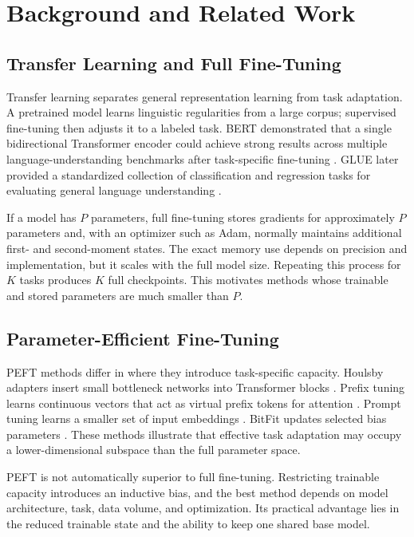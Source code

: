 \chapter{Background and Related Work}
\label{chap:background}

\section{Transfer Learning and Full Fine-Tuning}

Transfer learning separates general representation learning from task adaptation. A pretrained
model learns linguistic regularities from a large corpus; supervised fine-tuning then adjusts it
to a labeled task. BERT demonstrated that a single bidirectional Transformer encoder could achieve
strong results across multiple language-understanding benchmarks after task-specific fine-tuning
\citep{devlin2019bert}. GLUE later provided a standardized collection of classification and
regression tasks for evaluating general language understanding \citep{wang2018glue}.

If a model has $P$ parameters, full fine-tuning stores gradients for approximately $P$ parameters
and, with an optimizer such as Adam, normally maintains additional first- and second-moment states.
The exact memory use depends on precision and implementation, but it scales with the full model
size. Repeating this process for $K$ tasks produces $K$ full checkpoints. This motivates methods
whose trainable and stored parameters are much smaller than $P$.

\section{Parameter-Efficient Fine-Tuning}

PEFT methods differ in where they introduce task-specific capacity.
Houlsby adapters insert small bottleneck networks into Transformer blocks
\citep{houlsby2019parameter}. Prefix tuning learns continuous vectors that act as virtual prefix
tokens for attention \citep{li2021prefix}. Prompt tuning learns a smaller set of input embeddings
\citep{lester2021power}. BitFit updates selected bias parameters \citep{zaken2022bitfit}.
These methods illustrate that effective task adaptation may occupy a lower-dimensional subspace
than the full parameter space.

PEFT is not automatically superior to full fine-tuning. Restricting trainable capacity introduces
an inductive bias, and the best method depends on model architecture, task, data volume, and
optimization. Its practical advantage lies in the reduced trainable state and the ability to keep
one shared base model.

